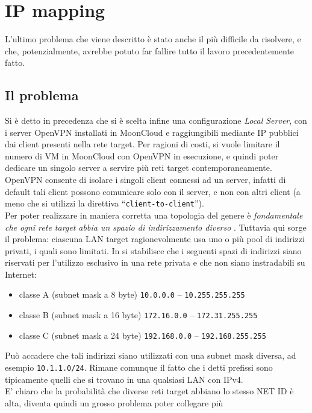 \section{IP mapping}
L'ultimo problema che viene descritto  è stato anche il
più difficile da risolvere, e che, potenzialmente, avrebbe potuto far fallire
tutto il lavoro precedentemente fatto.

\subsection{Il problema}
Si è detto in precedenza che si è scelta infine una configurazione \textit{Local
Server}, con i server OpenVPN installati in MoonCloud e raggiungibili mediante IP
pubblici dai client presenti nella rete target. Per ragioni di costi, si vuole
limitare il numero di VM in MoonCloud con OpenVPN in esecuzione, e quindi poter
dedicare un singolo server a servire più reti target contemporaneamente. OpenVPN
consente di isolare i singoli client connessi ad un server, infatti di default
tali client possono comunicare solo con il server, e non con altri client (a meno
che si utilizzi la direttiva ``\texttt{client-to-client}'').\\
Per poter realizzare in maniera corretta una topologia del genere è
\textit{fondamentale che ogni rete target abbia un spazio di indirizzamento diverso} \cite{openvpn-lan-to-lan}.
Tuttavia qui sorge il problema: ciascuna LAN target ragionevolmente usa uno o più
pool di indirizzi privati, i quali sono limitati. In \cite{RFC1918} si
stabilisce che i seguenti spazi di indirizzi siano riservati per l'utilizzo esclusivo
in una rete privata e che non siano instradabili su Internet:
\begin{itemize}
  \item classe A (subnet mask a 8 byte) \texttt{10.0.0.0} -- \texttt{10.255.255.255}
  \item classe B (subnet mask a 16 byte) \texttt{172.16.0.0} -- \texttt{172.31.255.255}
  \item classe C (subnet mask a 24 byte) \texttt{192.168.0.0} -- \texttt{192.168.255.255}
\end{itemize}
Può accadere che tali indirizzi siano utilizzati con una subnet mask diversa, ad esempio
\texttt{10.1.1.0/24}. Rimane
comunque il fatto che i detti prefissi sono tipicamente quelli che si trovano
in una qualsiasi LAN con IPv4.\\
E' chiaro che la probabilità che diverse reti target abbiano lo stesso NET ID
è alta, diventa
quindi un grosso problema poter collegare più

